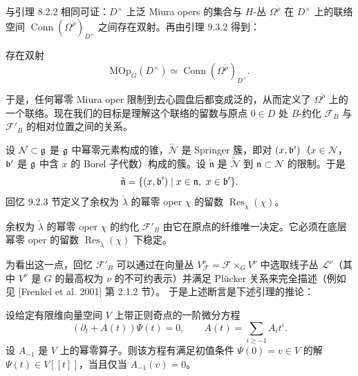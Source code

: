
与引理 8.2.2 相同可证：$D^\times$ 上泛 Miura opers 的集合与 $H$-丛 $\Omega^{\check\rho}$ 在 $D^\times$ 上的联络空间 $\operatorname{Conn}(\Omega^{\check\rho})_{D^\times}$ 之间存在双射。再由引理 9.3.2 得到：

\begin{lemma}
存在双射
\[
\mathrm{MOp}_G(D^\times)\simeq\operatorname{Conn}(\Omega^{\check\rho})_{D^\times}.
\]
\end{lemma}

于是，任何幂零 Miura oper 限制到去心圆盘后都变成泛的，从而定义了 $\Omega^{\check\rho}$ 上的一个联络。现在我们的目标是理解这个联络的留数与原点 $0\in D$ 处 $B$-约化 $\mathcal{F}_B$ 与 $\mathcal{F}'_B$ 的相对位置之间的关系。

设 $\mathcal{N}\subset\mathfrak{g}$ 是 $\mathfrak{g}$ 中幂零元素构成的锥，$\widetilde{\mathcal{N}}$ 是 Springer 簇，即对 $(x,\mathfrak{b}')$（$x\in\mathcal{N}$，$\mathfrak{b}'$ 是 $\mathfrak{g}$ 中含 $x$ 的 Borel 子代数）构成的簇。设 $\tilde{\mathfrak{n}}$ 是 $\widetilde{\mathcal{N}}$ 到 $\mathfrak{n}\subset\mathcal{N}$ 的限制。于是
\[
\tilde{\mathfrak{n}} = \{(x,\mathfrak{b}')\mid x\in\mathfrak{n},\ x\in\mathfrak{b}'\}.
\]
回忆 9.2.3 节定义了余权为 $\check\lambda$ 的幂零 oper $\chi$ 的留数 $\operatorname{Res}_{\check\lambda}(\chi)$。

\begin{lemma}
余权为 $\check\lambda$ 的幂零 oper $\chi$ 的约化 $\mathcal{F}'_B$ 由它在原点的纤维唯一决定。它必须在底层幂零 oper 的留数 $\operatorname{Res}_{\check\lambda}(\chi)$ 下稳定。
\end{lemma}

为看出这一点，回忆 $\mathcal{F}'_B$ 可以通过在向量丛 $V^\nu_{\mathcal{F}} = \mathcal{F}\times_G V^\nu$ 中选取线子丛 $\mathcal{L}^\nu$（其中 $V^\nu$ 是 $G$ 的最高权为 $\nu$ 的不可约表示）并满足 Plücker 关系来完全描述（例如见 [Frenkel et al. 2001] 第 2.1.2 节）。%
于是上述断言是下述引理的推论：

\begin{lemma}
设给定有限维向量空间 $V$ 上带正则奇点的一阶微分方程
\[
(\partial_t + A(t))\Psi(t) = 0,\qquad A(t) = \sum_{i\ge -1}A_it^i.
\]
设 $A_{-1}$ 是 $V$ 上的幂零算子。则该方程有满足初值条件 $\Psi(0)=v\in V$ 的解 $\Psi(t)\in V[[t]]$，当且仅当 $A_{-1}(v)=0$。
\end{lemma}

